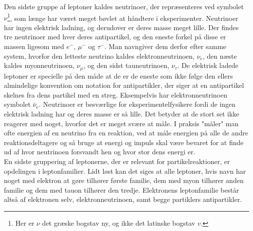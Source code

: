 Den sidste gruppe af leptoner kaldes neutrinoer, der repræsenteres ved symbolet $\nu$\footnote{Her er $\nu$ det græske bogstav ny, og ikke det latinske bogstav $v$.}, som længe har været meget bøvlet at håndtere i eksperimenter. Neutrinoer har ingen elektrisk ladning, og derudover er deres masse meget lille. Der findes tre neutrinoer med hver deres antipartikel, og den eneste forkel på disse er massen ligesom med $e^-$, $\mu^-$ og $\tau^-$. Man navngiver dem derfor efter samme system, hvorfor den letteste neutrino kaldes elektronneutrinoen, $\nu_e$, den næste kaldes myonneutrinoen, $\nu_\mu$, og den sidst tauneutrinoen, $\nu_\tau$. De elektrisk ladede leptoner er specielle på den måde at de er de eneste som ikke følge den ellers almindelige konvention om notation for antipartikler, der siger at en antipartikel skelnes fra dens partikel med en streg. Eksempelvis har elektronneutrinoen symbolet $\bar{\nu}_e$. Neutrinoer er besværlige for eksperimentelfysikere fordi de ingen elektrisk ladning har og deres masse er så lille. Det betyder at de stort set ikke reagerer med noget, hvorfor det er meget svære at måle. I praksis "måler" man ofte energien af en neutrino fra en reaktion, ved at måle energien på alle de andre reaktionsdeltagere og så bruge at energi og impuls skal være bevaret for at finde ud af hvor neutrinoen forsvandt hen og hvor stor dens energi er. \\

En sidste gruppering af leptonerne, der er relevant for partikelreaktioner, er opdelingen i leptonfamilier. Lidt løst kan det siges at alle leptoner, hvis navn har noget med elektron at gøre tilhører første familie, dem med myon tilhører anden familie og dem med tauon tilhører den tredje. Elektronens leptonfamilie består altså af elektronen selv, elektronneutrinoen, samt begge partiklers antipartikler.

